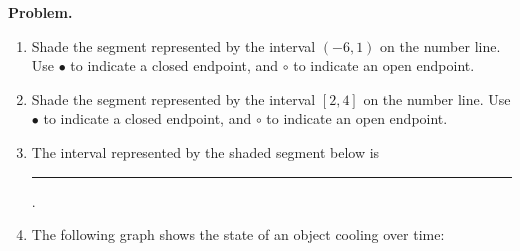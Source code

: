 \documentclass[twoside, 10pt]{article}
\begin{document}
{\noindent\bf Problem.}

\begin{enumerate}[leftmargin=*]
\item  Shade the segment represented by the interval \((-6, 1)\) on the number line. Use $\bullet$ to indicate a closed endpoint, and $\circ$ to indicate an open endpoint.
\begin{center}
\end{center}
\item  Shade the segment represented by the interval \([2, 4]\) on the number line. Use $\bullet$ to indicate a closed endpoint, and $\circ$ to indicate an open endpoint.
\begin{center}
\end{center}
\item The interval represented by the shaded segment below is \rule{10em}{0.1pt} .
\begin{center}
\end{center}
\item
The following graph shows the state of an object cooling over time:


\end{enumerate}
\end{document}
